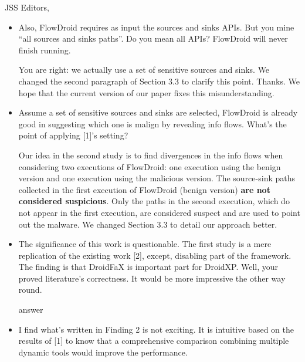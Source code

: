 \documentclass{letter}
\begin{document}
\begin{letter}{JSS Editors,}
\begin{itemize}
\vspace{0.2cm}

\item Also, FlowDroid requires as input the sources and sinks APIs. But you mine ``all sources and sinks 
paths''. Do you mean all APIs? FlowDroid will never finish running. 
\vspace{0.2cm}

{\color{blue}{\bf Answer.} You are right: we actually use a set of sensitive sources and sinks. We changed the second paragraph of Section 3.3 to clarify this point. Thanks. We hope that the current version of our paper fixes this misunderstanding.}

\vspace{0.2cm}
  
\item Assume a set of sensitive sources and sinks are selected, 
FlowDroid is already good in suggesting which one is malign by revealing info flows. What's the point of applying [1]'s setting?


\vspace{0.2cm}

{\color{blue}{\bf Answer.} Our idea in the second study is to find divergences in the info flows when considering two executions of FlowDroid: one execution using the benign version and one execution using the malicious version. The source-sink paths collected in the first execution of FlowDroid (benign version)
 {\bf are not considered suspicious}. Only the paths in the second execution, which do not appear in the first execution, are considered suspect and are used to point out the malware. We changed Section 3.3 to detail our approach better.}

\vspace{0.2cm}

\item The significance of this work is questionable. The first study is a mere replication of the existing work [2], except, disabling 
part of the framework. The finding is that DroidFaX is important part for DroidXP. Well, your proved literature's correctness. 
It would be more impressive the other way round.


\vspace{0.2cm}

{\color{blue}{\bf Answer.} answer}

\vspace{0.2cm}

\item I find what's written in Finding 2 is not exciting. It is intuitive based on the results of [1] to know that a comprehensive 
comparison combining multiple dynamic tools would improve the performance.



\end{itemize}
\end{letter}
\end{document}
